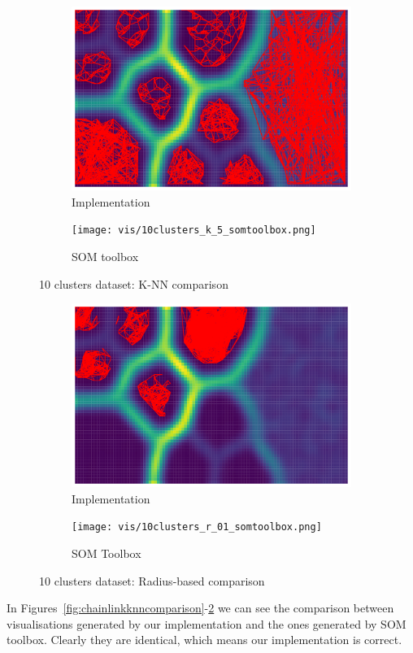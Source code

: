 \documentclass[12pt]{article}
\begin{document}
\begin{figure}[t]
    \centering
    \begin{subfigure}{.5\textwidth}
      \centering
      \includegraphics[width=.9\linewidth]{vis/10clusters_k_5.png}
      \caption{Implementation}
    \end{subfigure}%
    \begin{subfigure}{.5\textwidth}
      \centering
      \texttt{[image: vis/10clusters\_k\_5\_somtoolbox.png]}
      \caption{SOM toolbox}
    \end{subfigure}
    \caption{10 clusters dataset: K-NN comparison}
    \label{fig:10clustersknncomparison}
\end{figure}
\begin{figure}[t]
    \centering
    \begin{subfigure}{.5\textwidth}
        \centering
        \includegraphics[width=.9\linewidth]{vis/10clusters_r_01.png}
        \caption{Implementation}
    \end{subfigure}%
    \begin{subfigure}{.5\textwidth}
        \centering
        \texttt{[image: vis/10clusters\_r\_01\_somtoolbox.png]}
        \caption{SOM Toolbox}
    \end{subfigure}
    \caption{10 clusters dataset: Radius-based comparison}
    \label{fig:10clustersradiuscomparison}
\end{figure}
In Figures~\ref{fig:chainlinkknncomparison}-\ref{fig:10clustersradiuscomparison} we can see the comparison between visualisations generated by our implementation and the ones generated by SOM toolbox.
Clearly they are identical, which means our implementation is correct.
\end{document}
